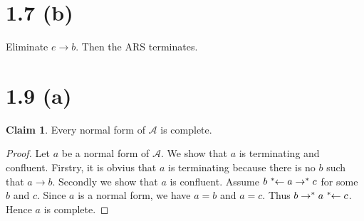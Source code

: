 \documentclass[autodetect-enginem]{article}
\title{}
\author{}
\date{}
\theoremstyle{plain}
\theoremstyle{definition}
\newtheorem*{claim*}{Claim}
\begin{document}
\section*{1.7 (b)}

Eliminate $e \rightarrow b$. Then the ARS terminates.

\section*{1.9 (a)}

\begin{claim*}
    Every normal form of $\mathcal{A}$ is complete.
\end{claim*}

\begin{proof}
    Let $a$ be a normal form of $\mathcal{A}$.
    We show that $a$ is terminating and confluent.
    Firstry, it is obvius that $a$ is terminating because there is no $b$ such that $a \rightarrow b$.
    Secondly we show that $a$ is confluent.
    Assume $b \;\reflectbox{$\rightarrow^*$}\; a \rightarrow^* c$ for some $b$ and $c$.
    Since $a$ is a normal form, we have $a=b$ and $a=c$. Thus $b \rightarrow^* a \;\reflectbox{$\rightarrow^*$} \; c$.
    Hence $a$ is complete.
\end{proof}

\section*{}
\end{document}
